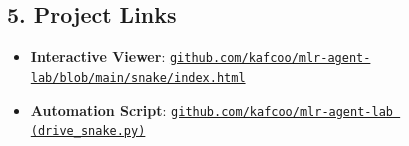 \documentclass[10pt,a4paper]{article}
\begin{document}
\vspace{-0.5em}
\subsection*{5. Project Links}
\vspace{-0.3em}
\begin{itemize}[leftmargin=*,itemsep=1pt,topsep=1pt]
    \item \textbf{Interactive Viewer}: \href{https://github.com/kafcoo/mlr-agent-lab/blob/main/snake/index.html}{\texttt{github.com/kafcoo/mlr-agent-lab/blob/main/snake/index.html}}
    \item \textbf{Automation Script}: \href{https://github.com/kafcoo/mlr-agent-lab}{\texttt{github.com/kafcoo/mlr-agent-lab (drive\_snake.py)}}
\end{itemize}
\end{document}
